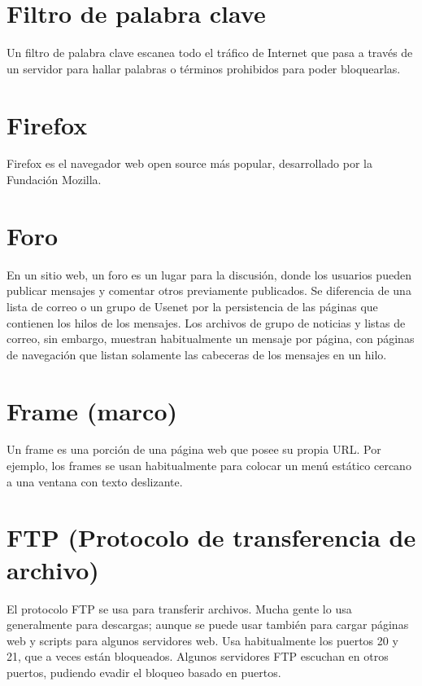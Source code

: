 \documentclass[10pt,a5paper,twoside,,]{book}
\begin{document}
\section{Filtro de palabra clave}\label{filtro-de-palabra-clave}

Un filtro de palabra clave escanea todo el tráfico de Internet que pasa
a través de un servidor para hallar palabras o términos prohibidos para
poder bloquearlas.

\section{Firefox}\label{firefox}

Firefox es el navegador web open source más popular, desarrollado por la
Fundación Mozilla.

\section{Foro}\label{foro}

En un sitio web, un foro es un lugar para la discusión, donde los
usuarios pueden publicar mensajes y comentar otros previamente
publicados. Se diferencia de una lista de correo o un grupo de Usenet
por la persistencia de las páginas que contienen los hilos de los
mensajes. Los archivos de grupo de noticias y listas de correo, sin
embargo, muestran habitualmente un mensaje por página, con páginas de
navegación que listan solamente las cabeceras de los mensajes en un
hilo.

\section{Frame (marco)}\label{frame-marco}

Un frame es una porción de una página web que posee su propia URL. Por
ejemplo, los frames se usan habitualmente para colocar un menú estático
cercano a una ventana con texto deslizante.

\section{FTP (Protocolo de transferencia de
archivo)}\label{ftp-protocolo-de-transferencia-de-archivo}

El protocolo FTP se usa para transferir archivos. Mucha gente lo usa
generalmente para descargas; aunque se puede usar también para cargar
páginas web y scripts para algunos servidores web. Usa habitualmente los
puertos 20 y 21, que a veces están bloqueados. Algunos servidores FTP
escuchan en otros puertos, pudiendo evadir el bloqueo basado en puertos.
\end{document}
